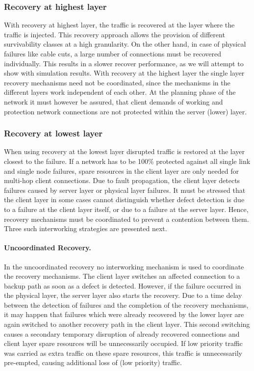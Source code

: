 \subsubsection{Recovery at highest layer}

With recovery at highest layer, the traffic is recovered at the layer
where the traffic is injected. This recovery approach allows the provision
of different survivability classes at a high granularity. On the other
hand, in case of physical failures like cable cuts, a large number
of connections must be recovered individually. This results in a slower
recover performance, as we will attempt to show with simulation results.
With recovery at the highest layer the single layer recovery mechanisms
need not be coordinated, since the mechanisms in the different layers
work independent of each other. At the planning phase of the network
it must however be assured, that client demands of working and protection
network connections are not protected within the server (lower) layer.


\subsubsection{Recovery at lowest layer}

When using recovery at the lowest layer disrupted traffic is restored
at the layer closest to the failure. If a network has to be 100\%
protected against all single link and single node failures, spare
resources in the client layer are only needed for multi-hop client
connections. Due to fault propagation, the client layer detects failures
caused by server layer or physical layer failures. It must be stressed
that the client layer in some cases cannot distinguish whether defect
detection is due to a failure at the client layer itself, or due to
a failure at the server layer. Hence, recovery mechanisms must be
coordinated to prevent a contention between them. Three such interworking
strategies are presented next.


\paragraph{Uncoordinated Recovery.}

In the uncoordinated recovery no interworking mechanism is used to
coordinate the recovery mechanisms. The client layer switches an affected
connection to a backup path as soon as a defect is detected. However,
if the failure occurred in the physical layer, the server layer also
starts the recovery. Due to a time delay between the detection of
failures and the completion of the recovery mechanisms, it may happen
that failures which were already recovered by the lower layer are
again switched to another recovery path in the client layer. This
second switching causes a secondary temporary disruption of already
recovered connections and client layer spare resources will be unnecessarily
occupied. If low priority traffic was carried as extra traffic on
these spare resources, this traffic is unnecessarily pre-empted, causing
additional loss of (low priority) traffic.


